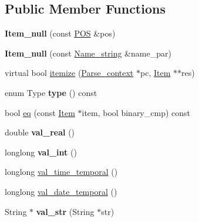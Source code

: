 \subsection*{Public Member Functions}
\begin{DoxyCompactItemize}
\item 
\mbox{\label{classItem__null_a6c5e8f67d781acfa9fd4ace13b5b89fe}} 
{\bfseries Item\+\_\+null} (const \mbox{\hyperlink{structYYLTYPE}{P\+OS}} \&pos)
\item 
\mbox{\label{classItem__null_ac6b23dd37e19c9253e3a95583aad0fcb}} 
{\bfseries Item\+\_\+null} (const \mbox{\hyperlink{className__string}{Name\+\_\+string}} \&name\+\_\+par)
\item 
virtual bool \mbox{\hyperlink{classItem__null_a7784bff3d6b49a263711152e2e446076}{itemize}} (\mbox{\hyperlink{structParse__context}{Parse\+\_\+context}} $\ast$pc, \mbox{\hyperlink{classItem}{Item}} $\ast$$\ast$res)
\item 
\mbox{\label{classItem__null_afff08a5c4ed5d2462a646cd6c02c7072}} 
enum Type {\bfseries type} () const
\item 
bool \mbox{\hyperlink{classItem__null_acf71d2194641e39c7aa1d9863ddd4fd7}{eq}} (const \mbox{\hyperlink{classItem}{Item}} $\ast$item, bool binary\+\_\+cmp) const
\item 
\mbox{\label{classItem__null_aa7567ded8d9db335e0341b252118db53}} 
double {\bfseries val\+\_\+real} ()
\item 
\mbox{\label{classItem__null_ac72395df645cf1600f0d1071ec36d8a0}} 
longlong {\bfseries val\+\_\+int} ()
\item 
longlong \mbox{\hyperlink{classItem__null_a9e65f0e26156a43bcb6c4d915389662d}{val\+\_\+time\+\_\+temporal}} ()
\item 
longlong \mbox{\hyperlink{classItem__null_a99590d9cddd9f8fbc0a6bfbc848325e9}{val\+\_\+date\+\_\+temporal}} ()
\item 
\mbox{\label{classItem__null_a520e9f19b3b598aeb3ef24e220d0a16f}} 
String $\ast$ {\bfseries val\+\_\+str} (String $\ast$str)
\item 
\mbox{\label{classItem__null_ab5c08d6abe79f35f1f01799e99041c52}} 
$$
\end{DoxyCompactItemize}
